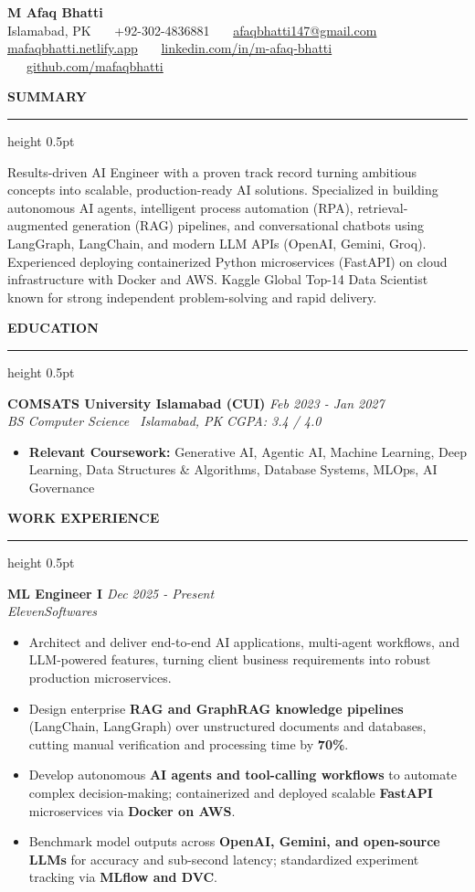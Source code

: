 \documentclass[10pt,letterpaper]{article}
\newcommand{\resumesection}[1]{%
  \vspace{3.5pt}%
  {\fontsize{10.5pt}{12pt}\selectfont\textbf{\MakeUppercase{#1}}}%
  \vspace{1.5pt}%
  \hrule height 0.5pt%
  \vspace{2.5pt}%
}
\begin{document}
\begin{center}
  {\fontsize{18pt}{20pt}\selectfont\textbf{M Afaq Bhatti}}\\[3pt]
  {\fontsize{9pt}{11pt}\selectfont Islamabad, PK \ \textbar\ \ +92-302-4836881 \ \textbar\ \ \href{mailto:afaqbhatti147@gmail.com}{afaqbhatti147@gmail.com}}\\[2pt]
  {\fontsize{9pt}{11pt}\selectfont \href{https://mafaqbhatti.netlify.app/}{mafaqbhatti.netlify.app} \ \textbar\ \ \href{https://www.linkedin.com/in/m-afaq-bhatti/}{linkedin.com/in/m-afaq-bhatti} \ \textbar\ \ \href{https://github.com/mafaqbhatti}{github.com/mafaqbhatti}}
\end{center}
\vspace{-6pt}

\resumesection{Summary}
Results-driven AI Engineer with a proven track record turning ambitious concepts into scalable, production-ready AI solutions. Specialized in building autonomous AI agents, intelligent process automation (RPA), retrieval-augmented generation (RAG) pipelines, and conversational chatbots using LangGraph, LangChain, and modern LLM APIs (OpenAI, Gemini, Groq). Experienced deploying containerized Python microservices (FastAPI) on cloud infrastructure with Docker and AWS. Kaggle Global Top-14 Data Scientist known for strong independent problem-solving and rapid delivery.

\resumesection{Education}
\noindent\textbf{COMSATS University Islamabad (CUI)} \hfill \textit{Feb 2023 - Jan 2027} \\
\textit{BS Computer Science \textbar\ Islamabad, PK} \hfill \textit{CGPA: 3.4 / 4.0}
\begin{itemize}
  \item \textbf{Relevant Coursework:} Generative AI, Agentic AI, Machine Learning, Deep Learning, Data Structures \& Algorithms, Database Systems, MLOps, AI Governance
\end{itemize}

\resumesection{Work Experience}
\noindent\textbf{ML Engineer I} \hfill \textit{Dec 2025 - Present} \\
\textit{ElevenSoftwares}
\begin{itemize}
  \item Architect and deliver end-to-end AI applications, multi-agent workflows, and LLM-powered features, turning client business requirements into robust production microservices.
  \item Design enterprise \textbf{RAG and GraphRAG knowledge pipelines} (LangChain, LangGraph) over unstructured documents and databases, cutting manual verification and processing time by \textbf{70\%}.
  \item Develop autonomous \textbf{AI agents and tool-calling workflows} to automate complex decision-making; containerized and deployed scalable \textbf{FastAPI} microservices via \textbf{Docker on AWS}.
  \item Benchmark model outputs across \textbf{OpenAI, Gemini, and open-source LLMs} for accuracy and sub-second latency; standardized experiment tracking via \textbf{MLflow and DVC}.
\end{itemize}
\end{document}
